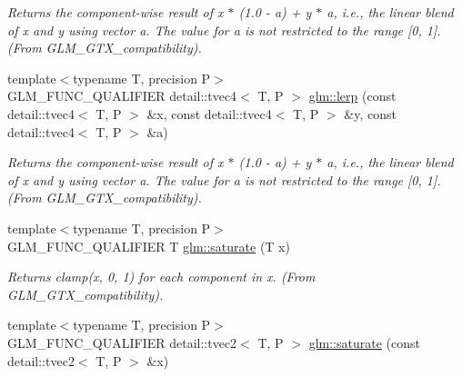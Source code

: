 \begin{CompactItemize}
\begin{CompactList}\small\item\em Returns the component-wise result of x $\ast$ (1.0 - a) + y $\ast$ a, i.e., the linear blend of x and y using vector a. The value for a is not restricted to the range \mbox{[}0, 1\mbox{]}. (From GLM\_\-GTX\_\-compatibility). \item\end{CompactList}\item 
\hypertarget{group__gtx__compatibility_g0155a663082f1a46246944249b47f584}{
{\footnotesize template$<$typename T, precision P$>$ }\\GLM\_\-FUNC\_\-QUALIFIER detail::tvec4$<$ T, P $>$ \hyperlink{group__gtx__compatibility_g0155a663082f1a46246944249b47f584}{glm::lerp} (const detail::tvec4$<$ T, P $>$ \&x, const detail::tvec4$<$ T, P $>$ \&y, const detail::tvec4$<$ T, P $>$ \&a)}
\label{group__gtx__compatibility_g0155a663082f1a46246944249b47f584}

\begin{CompactList}\small\item\em Returns the component-wise result of x $\ast$ (1.0 - a) + y $\ast$ a, i.e., the linear blend of x and y using vector a. The value for a is not restricted to the range \mbox{[}0, 1\mbox{]}. (From GLM\_\-GTX\_\-compatibility). \item\end{CompactList}\item 
\hypertarget{group__gtx__compatibility_g3f1e08f6c126c7e3585c36c32c108284}{
{\footnotesize template$<$typename T, precision P$>$ }\\GLM\_\-FUNC\_\-QUALIFIER T \hyperlink{group__gtx__compatibility_g3f1e08f6c126c7e3585c36c32c108284}{glm::saturate} (T x)}
\label{group__gtx__compatibility_g3f1e08f6c126c7e3585c36c32c108284}

\begin{CompactList}\small\item\em Returns clamp(x, 0, 1) for each component in x. (From GLM\_\-GTX\_\-compatibility). \item\end{CompactList}\item 
\hypertarget{group__gtx__compatibility_g47b0c02c94f44064bb190ec095947e28}{
{\footnotesize template$<$typename T, precision P$>$ }\\GLM\_\-FUNC\_\-QUALIFIER detail::tvec2$<$ T, P $>$ \hyperlink{group__gtx__compatibility_g47b0c02c94f44064bb190ec095947e28}{glm::saturate} (const detail::tvec2$<$ T, P $>$ \&x)}
\label{group__gtx__compatibility_g47b0c02c94f44064bb190ec095947e28}


\end{CompactItemize}
